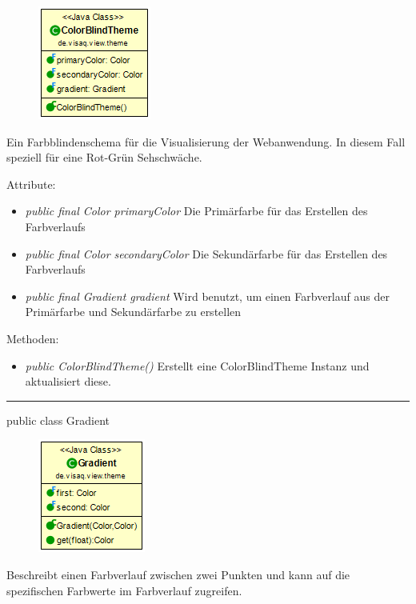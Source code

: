 \begin{minipage}{0.3\textwidth}
\begin{figure}[H]
    \includegraphics[scale = 0.5]{media/frontend/view/de.view.elements.theme/ColorBlindTheme_Class.png}
\end{figure}
\end{minipage} \hfill
\begin{minipage}{0.6\textwidth}
    Ein Farbblindenschema für die Visualisierung der Webanwendung. In diesem Fall speziell für eine Rot-Grün Sehschwäche.
\end{minipage}

Attribute:
\begin{itemize}
    \item \emph{public final Color primaryColor} Die Primärfarbe für das Erstellen des Farbverlaufs
    \item \emph{public final Color secondaryColor} Die Sekundärfarbe für das Erstellen des Farbverlaufs
    \item \emph{public final Gradient gradient} Wird benutzt, um einen Farbverlauf aus der Primärfarbe und Sekundärfarbe zu erstellen
\end{itemize}
Methoden:
\begin{itemize} 
    \item \emph{public ColorBlindTheme()} Erstellt eine ColorBlindTheme Instanz und aktualisiert diese.
\end{itemize}

\rule{\textwidth}{0.4pt}
public class Gradient

\begin{minipage}{0.3\textwidth}
    \begin{figure}[H]
    \includegraphics[scale = 0.5]{media/frontend/view/de.view.elements.theme/Gradient_Class.png}
    \end{figure}
    \end{minipage} \hfill
    \begin{minipage}{0.6\textwidth}
    Beschreibt einen Farbverlauf zwischen zwei Punkten und kann auf die spezifischen Farbwerte im Farbverlauf zugreifen.
    \end{minipage}

